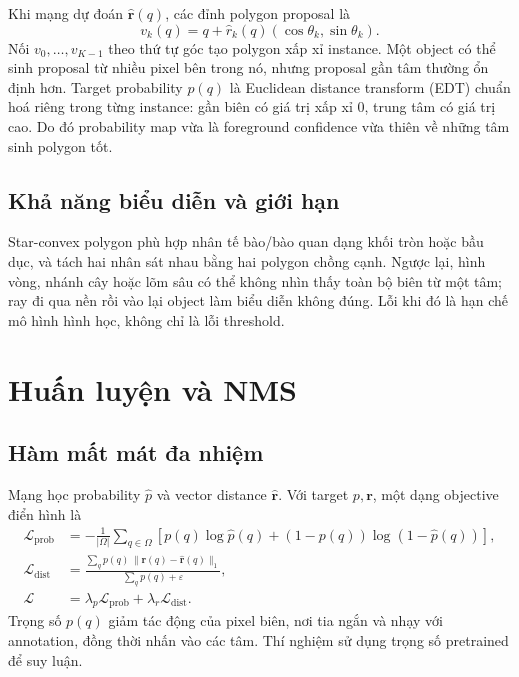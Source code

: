 \documentclass[12pt,a4paper]{report}
\begin{document}
Khi mạng dự đoán $\hat{\mathbf r}(q)$, các đỉnh polygon proposal là
\begin{equation}
 v_k(q)=q+\hat r_k(q)(\cos\theta_k,\sin\theta_k).
 \label{eq:polygon-vertices}
\end{equation}
Nối $v_0,\ldots,v_{K-1}$ theo thứ tự góc tạo polygon xấp xỉ instance. Một object
có thể sinh proposal từ nhiều pixel bên trong nó, nhưng proposal gần tâm thường
ổn định hơn. Target probability $p(q)$ là Euclidean distance transform (EDT)
chuẩn hoá riêng trong từng instance: gần biên có giá trị xấp xỉ 0, trung tâm có
giá trị cao. Do đó probability map vừa là foreground confidence vừa thiên về
những tâm sinh polygon tốt.

\subsection{Khả năng biểu diễn và giới hạn}
Star-convex polygon phù hợp nhân tế bào/bào quan dạng khối tròn hoặc bầu dục,
và tách hai nhân sát nhau bằng hai polygon chồng cạnh. Ngược lại, hình vòng,
nhánh cây hoặc lõm sâu có thể không nhìn thấy toàn bộ biên từ một tâm; ray đi
qua nền rồi vào lại object làm biểu diễn không đúng. Lỗi khi đó là hạn chế mô
hình hình học, không chỉ là lỗi threshold.

\section{Huấn luyện và NMS}
\subsection{Hàm mất mát đa nhiệm}
Mạng học probability $\hat p$ và vector distance $\hat{\mathbf r}$. Với target
$p,\mathbf r$, một dạng objective điển hình là
\begin{align}
 \mathcal{L}_{\mathrm{prob}}&=-\frac1{|\Omega|}\sum_{q\in\Omega}
 [p(q)\log\hat p(q)+(1-p(q))\log(1-\hat p(q))],\\
 \mathcal{L}_{\mathrm{dist}}&=\frac{\sum_q p(q)\,\|\mathbf r(q)-
 \hat{\mathbf r}(q)\|_1}{\sum_q p(q)+\varepsilon},\\
 \mathcal{L}&=\lambda_p\mathcal{L}_{\mathrm{prob}}+
 \lambda_r\mathcal{L}_{\mathrm{dist}}.
 \label{eq:stardist-loss}
\end{align}
Trọng số $p(q)$ giảm tác động của pixel biên, nơi tia ngắn và nhạy với
annotation, đồng thời nhấn vào các tâm. Thí nghiệm sử dụng trọng số pretrained để suy luận.
\end{document}
